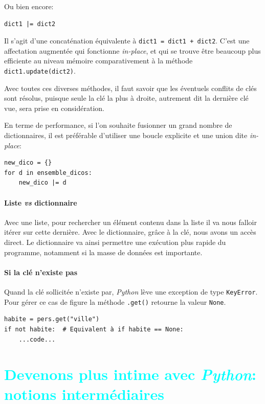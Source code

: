 \documentclass[a4paper,12pt]{book}
\begin{document}
Ou bien encore:
\begin{lstlisting}
dict1 |= dict2
\end{lstlisting}
\medskip

Il s'agit d'une concaténation équivalente à \texttt{dict1 = dict1 + dict2}. C'est une affectation augmentée qui fonctionne \og \textit{in-place}\fg{}, et qui se trouve être beaucoup plus efficiente au niveau mémoire comparativement à la méthode \texttt{dict1.update(dict2)}.
\medskip

Avec toutes ces diverses méthodes, il faut savoir que les éventuels conflits de clés sont résolus, puisque seule la clé la plus à droite, autrement dit la dernière clé vue, sera prise en considération.
\medskip

En terme de performance, si l'on souhaite fusionner un grand nombre de dictionnaires, il est préférable d'utiliser une boucle explicite et une union dite \og \textit{in-place}\fg{}:
\begin{lstlisting}
new_dico = {}
for d in ensemble_dicos:
    new_dico |= d
\end{lstlisting}
\medskip
 
\subsection*{Liste \textit{vs} dictionnaire}
Avec une liste, pour rechercher un élément contenu dans la liste il va nous falloir itérer sur cette dernière. Avec le dictionnaire, grâce à la clé, nous avons un accès direct. Le dictionnaire va ainsi permettre une exécution plus rapide du programme, notamment si la masse de données est importante.
\medskip

\subsection*{Si la clé n'existe pas}
Quand la clé sollicitée n'existe par, \textit{Python} lève une exception de type \texttt{KeyError}. Pour gérer ce cas de figure la méthode \texttt{.get()} retourne la valeur \texttt{None}.
\begin{lstlisting}
habite = pers.get("ville")
if not habite:  # Equivalent à if habite == None:
	...code...
\end{lstlisting}
\medskip

\part{\textcolor{cyan}{Devenons plus intime avec \textit{Python}: notions intermédiaires}}
\end{document}
